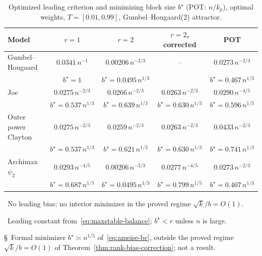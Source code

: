 \begin{table}[t]
\centering
\small
\caption{Optimized leading criterion and minimizing block size $b^\star$ (POT: $n/k_p$), optimal weights, $T=[0.01,0.99]$, Gumbel--Hougaard(2) attractor.}
\label{tab:comparison-bstar}
\begin{tabular}{lcccc}
\toprule
Model & $r=1$ & $r=2$ & $r=2$, corrected & POT\\
\midrule
Gumbel--Hougaard & $0.0341\,n^{-1}$ & $0.00206\,n^{-2/3}$\rlap{\,\textsuperscript{\ddag}} & --\rlap{\,\textsuperscript{\dag}} & $0.0273\,n^{-2/3}$\\
 & $\scriptstyle b^\star=1$ & $\scriptstyle b^\star=0.0495\,n^{1/3}$ &  & $\scriptstyle b^\star=0.467\,n^{1/3}$\\[2pt]
Joe & $0.0275\,n^{-2/3}$ & $0.0266\,n^{-2/3}$ & $0.0263\,n^{-2/3}$ & $0.0290\,n^{-4/5}$\\
 & $\scriptstyle b^\star=0.537\,n^{1/3}$ & $\scriptstyle b^\star=0.639\,n^{1/3}$ & $\scriptstyle b^\star=0.630\,n^{1/3}$ & $\scriptstyle b^\star=0.596\,n^{1/5}$\\[2pt]
Outer power Clayton & $0.0275\,n^{-2/3}$ & $0.0259\,n^{-2/3}$ & $0.0263\,n^{-2/3}$ & $0.0433\,n^{-2/3}$\\
 & $\scriptstyle b^\star=0.537\,n^{1/3}$ & $\scriptstyle b^\star=0.621\,n^{1/3}$ & $\scriptstyle b^\star=0.630\,n^{1/3}$ & $\scriptstyle b^\star=0.741\,n^{1/3}$\\[2pt]
Archimax $\psi_2$ & $0.0293\,n^{-4/5}$ & $0.00206\,n^{-2/3}$\rlap{\,\textsuperscript{\ddag}} & $0.0277\,n^{-4/5}$\rlap{\,\textsuperscript{\S}} & $0.0273\,n^{-2/3}$\\
 & $\scriptstyle b^\star=0.687\,n^{1/5}$ & $\scriptstyle b^\star=0.0495\,n^{1/3}$ & $\scriptstyle b^\star=0.799\,n^{1/5}$ & $\scriptstyle b^\star=0.467\,n^{1/3}$\\[2pt]
\bottomrule
\end{tabular}

\smallskip
{\footnotesize
\dag~No leading bias; no interior minimizer in the proved regime $\sqrt{k}/b=O(1)$.\par
\ddag~Leading constant from~\eqref{eq:maxstable-balance}; $b^\star<r$ unless $n$ is large.\par
\S~Formal minimizer $b^\star\asymp n^{1/5}$ of~\eqref{eq:ameise-bc}, outside the
proved regime $\sqrt{k}/b=O(1)$ of Theorem~\ref{thm:rank-bias-correction}; not a result.}
\end{table}
